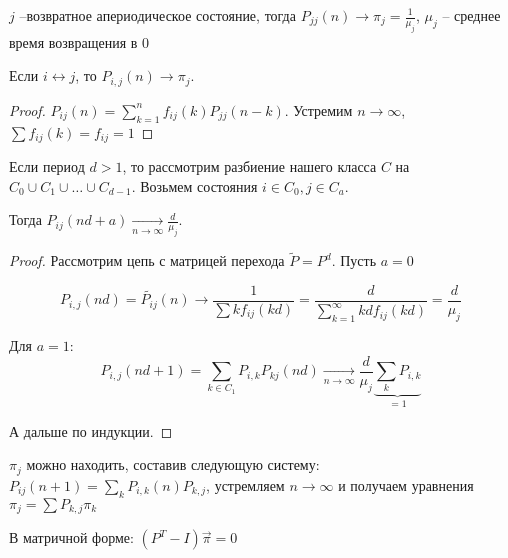 \begin{theorem}

$j$ --возвратное апериодическое состояние, тогда $P_{jj}(n) \to \pi_j = \frac{1}{\mu_j}$, $\mu_j$ -- среднее время возвращения в 0
\end{theorem}
\begin{conseq}
Если $i \leftrightarrow j$, то $P_{i,j}(n) \to \pi_j$.
\end{conseq}
\begin{proof}
$P_{ij}(n) = \sum\limits_{k=1}^n f_{ij}(k) P_{jj}(n - k)$. Устремим $n \to \infty$, $\sum f_{ij}(k) = f_{ij} = 1$
\end{proof}
\begin{conseq}
Если период $d > 1$, то рассмотрим разбиение нашего класса $C$ на $C_0 \cup C_1 \cup \dots \cup C_{d-1}$.
Возьмем состояния $i \in C_0, j \in C_a$. 

Тогда $P_{ij}(nd+a) \xrightarrow[n \to \infty]{} \frac{d}{\mu_j}$.

\end{conseq}
\begin{proof}
Рассмотрим цепь с матрицей перехода $\widetilde{P} = P^d$. Пусть $a = 0$

$$P_{i,j}(nd) = \widetilde{P_{ij}}(n) \to \frac{1}{\sum k f_{ij}(kd)} = \frac{d}{\sum\limits_{k=1}^\infty kd f_{ij}(kd)} = \frac{d}{\mu_j}$$

Для $a = 1$: 
$$P_{i,j}(nd + 1) = \sum\limits_{k \in C_1} P_{i,k} P_{kj}(nd) \xrightarrow[n \to \infty]{} \frac{d}{\mu_j} \underbrace{\sum\limits_k P_{i, k}}_{=1}$$

А дальше по индукции.
\end{proof}
\begin{Rem}
$\pi_j$ можно находить, составив следующую систему:
$P_{ij}(n + 1) = \sum\limits_k P_{i, k}(n) P_{k, j}$, устремляем $n \to \infty$ и получаем уравнения $\pi_j = \sum P_{k, j} \pi_k$

В матричной форме: $(P^T - I) \overrightarrow{\pi} = 0$
\end{Rem}

